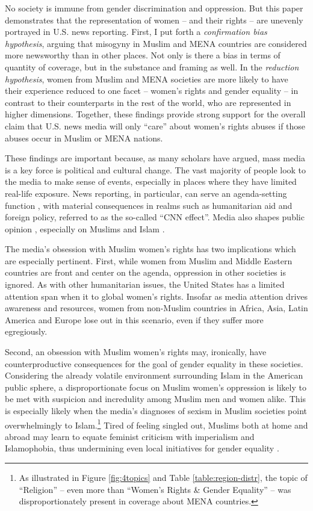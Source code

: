 \documentclass[11pt, oneside]{article}
\begin{document}
No society is immune from gender discrimination and oppression. But this paper demonstrates that the representation of women -- and their rights -- are unevenly portrayed in U.S. news reporting. First, I put forth a \emph{confirmation bias hypothesis}, arguing that misogyny in Muslim and MENA countries are considered more newsworthy than in other places. Not only is there a bias in terms of quantity of coverage, but in the substance and framing as well. In the \emph{reduction hypothesis}, women from Muslim and MENA societies are more likely to have their experience reduced to one facet -- women's rights and gender equality -- in contrast to their counterparts in the rest of the world, who are represented in higher dimensions. Together, these findings provide strong support for the overall claim that U.S. news media will only ``care'' about women's rights abuses if those abuses occur in Muslim or MENA nations. 

These findings are important because, as many scholars have argued, mass media is a key force is political and cultural change. The vast majority of people look to the media to make sense of events, especially in places where they have limited real-life exposure. News reporting, in particular, can serve an agenda-setting function \cite{mccombs_agenda-setting_1972}, with material consequences in realms such as humanitarian aid and foreign policy, referred to as the so-called ``CNN effect''\cite {robinson_cnn_1999,robinson_theorizing_2001,baum_relationships_2008}. Media also shapes public opinion \cite{gamson1989media,kinder_communication_1998}, especially on Muslims and Islam \cite{bail2012fringe,mcalister_epic_2001,said_covering_2008}. 

The media's obsession with Muslim women's rights has two implications which are especially pertinent. First, while women from Muslim and Middle Eastern countries are front and center on the agenda, oppression in other societies is ignored. As with other humanitarian issues, the United States has a limited attention span when it to global women's rights. Insofar as media attention drives awareness and resources, women from non-Muslim countries in Africa, Asia, Latin America and Europe lose out in this scenario, even if they suffer more egregiously.

Second, an obsession with Muslim women's rights may, ironically, have counterproductive consequences for the goal of gender equality in these societies. Considering the already volatile environment surrounding Islam in the American public sphere, a disproportionate focus on Muslim women's oppression is likely to be met with suspicion and incredulity among Muslim men and women alike. This is especially likely when the media's diagnoses of sexism in Muslim societies point overwhelmingly to Islam.\footnote{ As illustrated in Figure \ref{fig:4topics} and Table \ref{table:region-distr}, the topic of ``Religion'' -- even more than ``Women's Rights \& Gender Equality'' -- was disproportionately present in coverage about MENA countries.} Tired of feeling singled out, Muslims both at home and abroad may learn to equate feminist criticism with imperialism and Islamophobia, thus undermining even local initiatives for gender equality \cite{terman2015islamophobia}.
\end{document}
